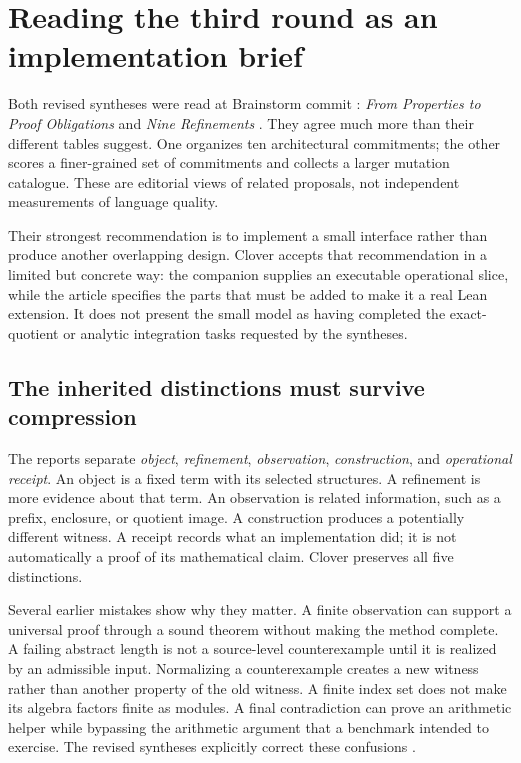 \documentclass[11pt,a4paper]{article}
\newcommand{\code}[1]{\texttt{\detokenize{#1}}}
\theoremstyle{definition}
\theoremstyle{remark}
\begin{document}
\section{Reading the third round as an implementation brief}\label{sec:round3}

Both revised syntheses were read at Brainstorm commit
\code{bf3333905995}:
\emph{From Properties to Proof Obligations} and \emph{Nine Refinements}
\cite{syn-a,syn-b}. They agree much more than their different tables suggest.
One organizes ten architectural commitments; the other scores a finer-grained
set of commitments and collects a larger mutation catalogue. These are editorial
views of related proposals, not independent measurements of language quality.

Their strongest recommendation is to implement a small interface rather than
produce another overlapping design. Clover accepts that recommendation in a
limited but concrete way: the companion supplies an executable operational
slice, while the article specifies the parts that must be added to make it a
real Lean extension. It does not present the small model as having completed
the exact-quotient or analytic integration tasks requested by the syntheses.

\subsection{The inherited distinctions must survive compression}

The reports separate \emph{object}, \emph{refinement}, \emph{observation},
\emph{construction}, and \emph{operational receipt}. An object is a fixed term
with its selected structures. A refinement is more evidence about that term.
An observation is related information, such as a prefix, enclosure, or quotient
image. A construction produces a potentially different witness. A receipt
records what an implementation did; it is not automatically a proof of its
mathematical claim. Clover preserves all five distinctions.

Several earlier mistakes show why they matter. A finite observation can support
a universal proof through a sound theorem without making the method complete.
A failing abstract length is not a source-level counterexample until it is
realized by an admissible input. Normalizing a counterexample creates a new
witness rather than another property of the old witness. A finite index set
does not make its algebra factors finite as modules. A final contradiction
can prove an arithmetic helper while bypassing the arithmetic argument that a
benchmark intended to exercise. The revised syntheses explicitly correct these
confusions \cite{syn-a,syn-b}.
\end{document}
